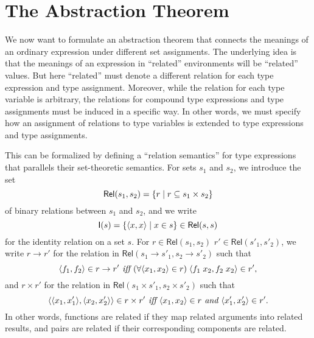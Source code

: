 \documentclass[sigplan,screen,nonacm,balance=false]{acmart}
\theoremstyle{plain}
\DeclarePairedDelimiter{\set}{\{}{\}}
\DeclarePairedDelimiter{\pair}{\langle}{\rangle}
\newcommand{\Rel}{\mathsf{Rel}}
\newcommand{\Id}{\mathsf{I}}
\begin{document}
\section{The Abstraction Theorem}

We now want to formulate an abstraction theorem that connects the meanings of an ordinary expression under different set assignments.
The underlying idea is that the meanings of an expression in ``related'' environments will be ``related'' values.
But here ``related'' must denote a different relation for each type expression and type assignment.
Moreover, while the relation for each type variable is arbitrary, the relations for compound type expressions and type assignments must be induced in a specific way.
In other words, we must specify how an assignment of relations to type variables is extended to type expressions and type assignments.

This can be formalized by defining a ``relation semantics'' for type expressions that parallels their set-theoretic semantics.
For sets $s_1$ and $s_2$, we introduce the set
%
\begin{equation*}
  \Rel(s_1, s_2) = \set{r \mid r \subseteq s_1 \times s_2}
\end{equation*}
%
of binary relations between $s_1$ and $s_2$, and we write
%
\begin{equation*}
  \Id(s) = \set{\pair{x, x} \mid x \in s} \in \Rel(s, s)
\end{equation*}
%
for the identity relation on a set $s$.
For $r \in \Rel(s_1, s_2)$ $r' \in \Rel(s'_1, s'_2)$, we write $r \to r'$ for the relation in $\Rel(s_1 \to s'_1, s_2 \to s'_2)$ such that
%
\begin{equation*}
  \pair{f_1, f_2} \in r \to r' \textit{ iff } (\forall \pair{x_1, x_2} \in r) \; \pair{f_1 \; x_2, f_2 \; x_2} \in r',
\end{equation*}
%
and $r \times r'$ for the relation in $\Rel(s_1 \times s'_1, s_2 \times s'_2)$ such that
%
\begin{equation*}
  \pair{\pair{x_1, x'_1}, \pair{x_2, x'_2}} \in r \times r' \textit{ iff } \pair{x_1, x_2} \in r \textit{ and } \pair{x'_1, x'_2} \in r'.
\end{equation*}
%
In other words, functions are related if they map related arguments into related results, and pairs are related if their corresponding components are related.
\end{document}
